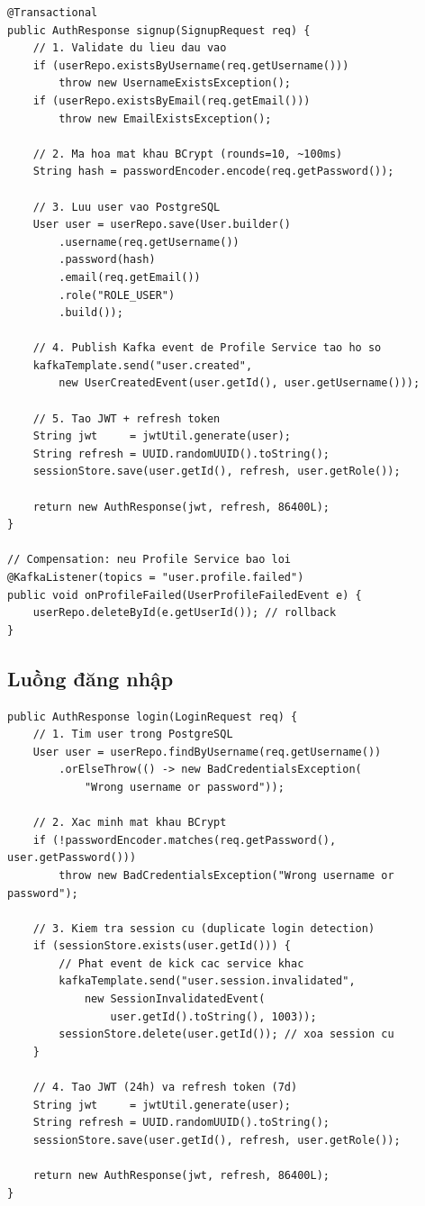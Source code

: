 \documentclass[12pt,a4paper]{report}
\begin{document}
\begin{lstlisting}[style=javaStyle, caption={Xử lý đăng ký với Saga Pattern}, label={lst:signup}]
@Transactional
public AuthResponse signup(SignupRequest req) {
    // 1. Validate du lieu dau vao
    if (userRepo.existsByUsername(req.getUsername()))
        throw new UsernameExistsException();
    if (userRepo.existsByEmail(req.getEmail()))
        throw new EmailExistsException();

    // 2. Ma hoa mat khau BCrypt (rounds=10, ~100ms)
    String hash = passwordEncoder.encode(req.getPassword());

    // 3. Luu user vao PostgreSQL
    User user = userRepo.save(User.builder()
        .username(req.getUsername())
        .password(hash)
        .email(req.getEmail())
        .role("ROLE_USER")
        .build());

    // 4. Publish Kafka event de Profile Service tao ho so
    kafkaTemplate.send("user.created",
        new UserCreatedEvent(user.getId(), user.getUsername()));

    // 5. Tao JWT + refresh token
    String jwt     = jwtUtil.generate(user);
    String refresh = UUID.randomUUID().toString();
    sessionStore.save(user.getId(), refresh, user.getRole());

    return new AuthResponse(jwt, refresh, 86400L);
}

// Compensation: neu Profile Service bao loi
@KafkaListener(topics = "user.profile.failed")
public void onProfileFailed(UserProfileFailedEvent e) {
    userRepo.deleteById(e.getUserId()); // rollback
}
\end{lstlisting}

\subsection{Luồng đăng nhập}

\begin{lstlisting}[style=javaStyle, caption={Xử lý đăng nhập với kiểm tra duplicate login}, label={lst:login}]
public AuthResponse login(LoginRequest req) {
    // 1. Tim user trong PostgreSQL
    User user = userRepo.findByUsername(req.getUsername())
        .orElseThrow(() -> new BadCredentialsException(
            "Wrong username or password"));

    // 2. Xac minh mat khau BCrypt
    if (!passwordEncoder.matches(req.getPassword(), user.getPassword()))
        throw new BadCredentialsException("Wrong username or password");

    // 3. Kiem tra session cu (duplicate login detection)
    if (sessionStore.exists(user.getId())) {
        // Phat event de kick cac service khac
        kafkaTemplate.send("user.session.invalidated",
            new SessionInvalidatedEvent(
                user.getId().toString(), 1003));
        sessionStore.delete(user.getId()); // xoa session cu
    }

    // 4. Tao JWT (24h) va refresh token (7d)
    String jwt     = jwtUtil.generate(user);
    String refresh = UUID.randomUUID().toString();
    sessionStore.save(user.getId(), refresh, user.getRole());

    return new AuthResponse(jwt, refresh, 86400L);
}
\end{lstlisting}
\end{document}
